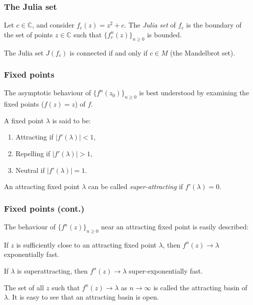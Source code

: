 \documentclass{beamer} %
\theoremstyle{definition} %
\newcommand{\Cplx}{\mathbb{C}}
\begin{document}
\begin{frame}\frametitle{The Julia set}
    Let $c \in \Cplx$, and consider $f_c(z) = z^2+c$. The \emph{Julia set} of $f_c$ is the boundary
    of the set of points $z \in \Cplx$ such that $\{f_c^n(z)\}_{n\geq 0}$ is bounded.
    \begin{theorem}[Mandelbrot]
        The Julia set $J(f_c)$ is connected if and only if $c \in M$ (the Mandelbrot set).
    \end{theorem}
\end{frame}

\begin{frame}\frametitle{Fixed points}
    The asymptotic behaviour of $\{f^n(z_0)\}_{n\geq 0}$ is best understood by examining the fixed points ($f(z) = z$) of $f$.
    
    A fixed point $\lambda$ is said to be:
    \begin{enumerate}
        \item{} Attracting if $|f'(\lambda)| < 1$,
        \item{} Repelling if $|f'(\lambda)| > 1$,
        \item{} Neutral if $|f'(\lambda)| = 1$.
    \end{enumerate}
    An attracting fixed point $\lambda$ can be called \emph{super-attracting} if $f'(\lambda) = 0$.
\end{frame}

\begin{frame}\frametitle{Fixed points (cont.)}
    The behaviour of $\{f^n(z)\}_{n\geq 0}$ near an attracting fixed point is easily described:
    
    
        If $z$ is sufficiently close to an attracting fixed point $\lambda$, then $f^n(z)\to \lambda$ exponentially fast.
        
        If $\lambda$ is superattracting, then $f^n(z)\to \lambda$ super-exponentially fast.
        
        
    The set of all $z$ such that $f^n(z)\to  \lambda$ as $n\to\infty$ is called the attracting basin of $\lambda$.
    It is easy to see that an attracting basin is open.
\end{frame}
\end{document}
